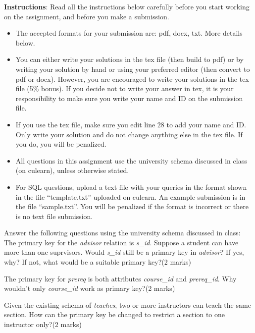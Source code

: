 \documentclass[a4 paper]{article}
\begin{document}
\textbf{Instructions}: Read all the instructions below carefully before you start working on the assignment, and before you make a submission.
\begin{itemize}
    \item The accepted formats for your submission are: pdf, docx, txt. More details below. 
    \item You can either write your solutions in the tex file (then build to pdf) or by writing your solution by hand or using your preferred editor (then convert to pdf or docx). However, you are encouraged to write your solutions in the tex file (5\% bonus). If you decide not to write your answer in tex, it is your responsibility to make sure you write your name and ID on the submission file.
    \item If you use the tex file, make sure you edit line 28 to add your name and ID. Only write your solution and do not change anything else in the tex file. If you do, you will be penalized.
    \item All questions in this assignment use the university schema discussed in class (on culearn), unless otherwise stated.
    \item For SQL questions, upload a text file with your queries in the format shown in the file ``template.txt'' uploaded on culearn. An example submission is in the file ``sample.txt''. You will be penalized if the format is incorrect or there is no text file submission. 
\end{itemize}


Answer the following questions using the university schema discussed in class: 
 The primary key for the \emph{advisor} relation is \emph{s\_id}. Suppose a student can have more than one suprvisors. Would \emph{s\_id} still be a primary key in \emph{advisor}? If yes, why? If not, what would be a suitable primary key?\indent (2 marks)

\vspace{3em}


 The primary key for \emph{prereq} is both attributes \emph{course\_id} and \emph{prereq\_id}. Why wouldn't only \emph{course\_id} work as primary key?\indent (2 marks)\\

\vspace{3em}


 Given the existing schema of \emph{teaches}, two or more instructors can teach the same section. How can the primary key be changed to restrict a section to one instructor only?\indent (2 marks)\\
\end{document}

